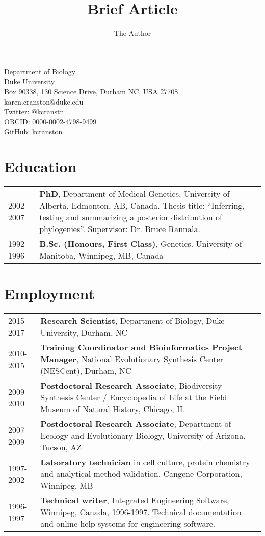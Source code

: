 \documentclass[10pt]{article}
\title{Brief Article}
\author{The Author}
\begin{document}
Department of Biology  \\
Duke University \\
Box 90338, 130 Science Drive, Durham NC, USA 27708 \\
karen.cranston@duke.edu \\
Twitter: \href{https://twitter.com/kcranstn}{@kcranstn} \\
ORCID: \href{http://orcid.org/0000-0002-4798-9499}{0000-0002-4798-9499} \\
GitHub: \href{https://github.com/kcranston}{kcranston}

\section*{Education}
\begin{table}[h]
	\begin{tabular}{ p{2.0cm} p{12.4cm} }
		2002-2007 & {\bf PhD}, Department of Medical Genetics, University of Alberta, Edmonton, AB, Canada. Thesis title: ``Inferring, testing and summarizing a posterior distribution of phylogenies''. Supervisor: Dr. Bruce Rannala. \\
		1992-1996 & {\bf B.Sc. (Honours, First Class)}, Genetics. University of Manitoba, Winnipeg, MB, Canada \\
	\end{tabular}
\end{table}

\section*{Employment}
\begin{table}[h]
	\begin{tabular}{ p{2.0cm} p{12.4cm} }
		2015-2017 & \textbf{Research Scientist}, Department of Biology, Duke University, Durham, NC \\
		2010-2015 & \textbf{Training Coordinator and Bioinformatics Project Manager}, National Evolutionary Synthesis Center (NESCent), Durham, NC \\
		2009-2010 & \textbf{Postdoctoral Research Associate}, Biodiversity Synthesis Center / Encyclopedia of Life at the Field Museum of Natural History, Chicago, IL  \\
		2007-2009 & \textbf{Postdoctoral Research Associate}, Department of Ecology and Evolutionary Biology, University of Arizona, Tucson, AZ \\
		1997-2002 & \textbf{Laboratory technician} in cell culture, protein chemistry and analytical method validation, Cangene Corporation, Winnipeg, MB \\
		1996-1997 & \textbf{Technical writer}, Integrated Engineering Software, Winnipeg, Canada, 1996-1997. Technical documentation and online help systems for engineering software. \\
	\end{tabular}
\end{table}
\end{document}
